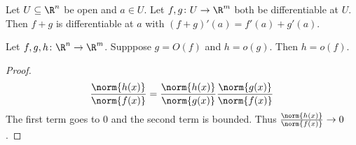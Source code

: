 \begin{exercise}[Sum]
    Let $U \subseteq \R^n$ be open and $a \in U$.
    Let $f, g\colon U \to \R^m$ both be differentiable at $U$.
    Then $f+g$ is differentiable at $a$ with
    $(f+g)'(a) = f'(a) + g'(a)$.
\end{exercise}

\begin{lemma} \label{thm:oO}
    Let $f, g, h\colon \R^n \to \R^m$.
    Supppose $g = O(f)$ and $h = o(g)$.
    Then $h = o(f)$.
\end{lemma}
\begin{proof}
    \[
        \frac{\norm{h(x)}}{\norm{f(x)}}
        = \frac{\norm{h(x)}}{\norm{g(x)}} \frac{\norm{g(x)}}{\norm{f(x)}}
    \] The first term goes to $0$ and the second term is bounded.
    Thus $\frac{\norm{h(x)}}{\norm{f(x)}} \to 0$.
\end{proof}

